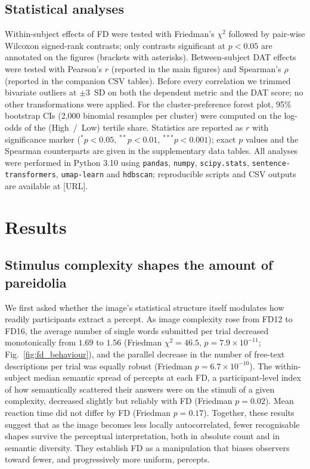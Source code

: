 \documentclass[11pt]{article}
\begin{document}
\subsection{Statistical analyses}
Within-subject effects of FD were tested with Friedman's $\chi^2$
followed by pair-wise Wilcoxon signed-rank contrasts; only contrasts
significant at $p < 0.05$ are annotated on the figures (brackets with
asterisks). Between-subject DAT effects were tested with Pearson's $r$
(reported in the main figures) and Spearman's $\rho$ (reported in the
companion CSV tables). Before every correlation we trimmed bivariate
outliers at $\pm 3$~SD on both the dependent metric and the DAT score;
no other transformations were applied. For the cluster-preference
forest plot, 95\% bootstrap CIs (2{,}000 binomial resamples per
cluster) were computed on the log-odds of the (High~/~Low) tertile
share. Statistics are reported as $r$ with significance marker
($^*p<0.05,\,^{**}p<0.01,\,^{***}p<0.001$); exact $p$ values and the
Spearman counterparts are given in the supplementary data tables. All
analyses were performed in Python 3.10 using
\texttt{pandas}, \texttt{numpy}, \texttt{scipy.stats},
\texttt{sentence-transformers}, \texttt{umap-learn} and
\texttt{hdbscan}; reproducible scripts and CSV outputs are available
at [URL].

\section{Results}

\subsection{Stimulus complexity shapes the amount of pareidolia}

We first asked whether the image's statistical structure itself
modulates how readily participants extract a percept. As image
complexity rose from FD12 to FD16, the average number of single words
submitted per trial decreased monotonically from $1.69$ to $1.56$
(Friedman $\chi^2 = 46.5$, $p = 7.9 \times 10^{-11}$;
Fig.~\ref{fig:fd_behaviour}), and the parallel decrease in the number
of free-text descriptions per trial was equally robust (Friedman
$p = 6.7 \times 10^{-10}$). The within-subject median semantic spread
of percepts at each FD, a participant-level index of how
semantically scattered their answers were on the stimuli of a given
complexity, decreased slightly but reliably with FD (Friedman
$p = 0.02$). Mean reaction time did not differ by FD (Friedman
$p = 0.17$). Together, these results suggest that as the image
becomes less locally autocorrelated, fewer recognisable shapes survive
the perceptual interpretation, both in absolute count and in semantic
diversity. They establish FD as a manipulation that biases observers
toward fewer, and progressively more uniform, percepts.
\end{document}
